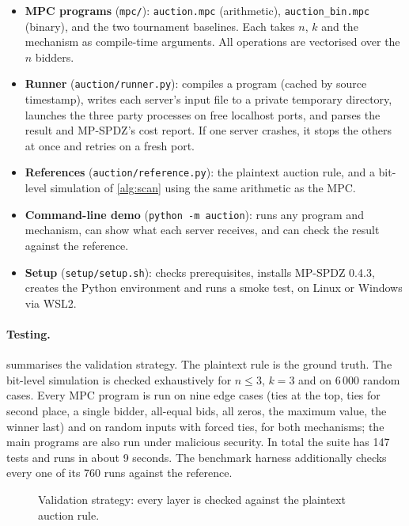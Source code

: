 \documentclass[11pt,a4paper]{article}
\newcommand{\code}[1]{\texttt{#1}}
\begin{document}
\begin{itemize}
  \item \textbf{MPC programs} (\code{mpc/}): \code{auction.mpc} (arithmetic),
        \code{auction\_bin.mpc} (binary), and the two tournament baselines. Each takes
        $n$, $k$ and the mechanism as compile-time arguments. All operations are vectorised over
        the $n$ bidders.
  \item \textbf{Runner} (\code{auction/runner.py}): compiles a program (cached by source
        timestamp), writes each server's input file to a private temporary directory, launches the
        three party processes on free localhost ports, and parses the result and MP-SPDZ's cost
        report. If one server crashes, it stops the others at once and retries on a fresh port.
  \item \textbf{References} (\code{auction/reference.py}): the plaintext auction rule, and a
        bit-level simulation of \cref{alg:scan} using the same arithmetic as the MPC.
  \item \textbf{Command-line demo} (\code{python -m auction}): runs any program and mechanism, can
        show what each server receives, and can check the result against the reference.
  \item \textbf{Setup} (\code{setup/setup.sh}): checks prerequisites, installs MP-SPDZ 0.4.3,
        creates the Python environment and runs a smoke test, on Linux or Windows via WSL2.
\end{itemize}

\paragraph{Testing.}
 summarises the validation strategy. The plaintext rule is the ground truth.
The bit-level simulation is checked exhaustively for $n \le 3$, $k = 3$ and on 6\,000 random cases.
Every MPC program is run on nine edge cases (ties at the top, ties for second place, a single
bidder, all-equal bids, all zeros, the maximum value, the winner last) and on random inputs with
forced ties, for both mechanisms; the main programs are also run under malicious security. In
total the suite has 147 tests and runs in about 9 seconds. The benchmark harness additionally
checks every one of its 760 runs against the reference.

\begin{figure}[H]
  \centering
  \resizebox{0.82\linewidth}{!}{}
  \caption{Validation strategy: every layer is checked against the plaintext auction rule.}
  \label{fig:validation}
\end{figure}
\end{document}
